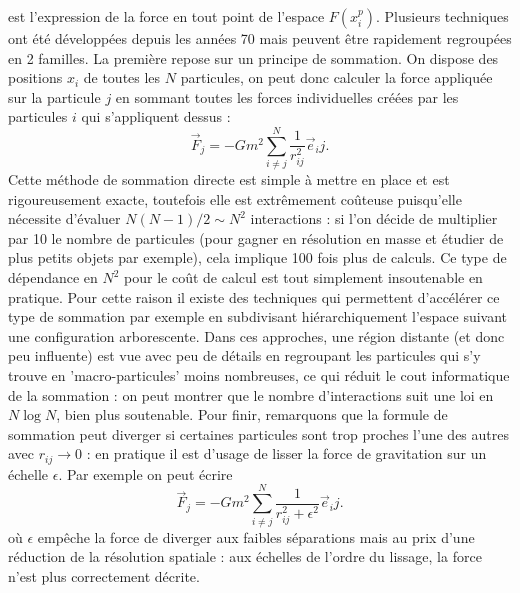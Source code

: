  est l'expression de la force en tout point de l'espace ${F}(x_i^p)$. Plusieurs techniques ont été développées depuis les années 70 mais peuvent être rapidement regroupées en 2 familles. La première repose sur un principe de sommation. On dispose des positions $x_i$ de toutes les $N$ particules, on peut donc calculer la force appliquée sur la particule $j$ en sommant toutes les forces individuelles créées par les particules $i$ qui s'appliquent dessus  :
\begin{equation}
\vec F_j=-Gm^2\sum_{i\neq j} ^N\frac{1}{r_{ij}^2}\vec e_ij. 
\end{equation}
Cette méthode de sommation directe est simple à mettre en place et est rigoureusement exacte, toutefois elle est extrêmement coûteuse puisqu'elle nécessite d'évaluer $N(N-1)/2 \sim N^2$ interactions : si l'on décide de multiplier par 10 le nombre de particules (pour gagner en résolution en masse et étudier de plus petits objets par exemple), cela implique 100 fois plus de calculs. Ce type de dépendance en $N^2$ pour le coût de calcul est tout simplement insoutenable en pratique. Pour cette raison il existe des techniques qui permettent d'accélérer ce type de sommation par exemple en subdivisant hiérarchiquement l'espace suivant une configuration arborescente. Dans ces approches, une région distante (et donc peu influente) est vue avec peu de détails en regroupant les particules qui s'y trouve en 'macro-particules' moins nombreuses, ce qui réduit le cout informatique de la sommation : on peut montrer que le nombre d'interactions suit une loi en $N\log N$, bien plus soutenable. Pour finir, remarquons que la formule de sommation peut diverger si certaines particules sont trop proches l'une des autres avec $r_{ij}\rightarrow 0$ : en pratique il est d'usage de lisser la force de gravitation sur un échelle $\epsilon$. Par exemple on peut écrire
\begin{equation}
\vec F_j=-Gm^2\sum_{i\neq j} ^N\frac{1}{r_{ij}^2+\epsilon^2}\vec e_ij. 
\end{equation}
où $\epsilon$ empêche la force de diverger aux faibles séparations mais au prix d'une réduction de la résolution spatiale : aux échelles de l'ordre du lissage, la force n'est plus correctement décrite.

